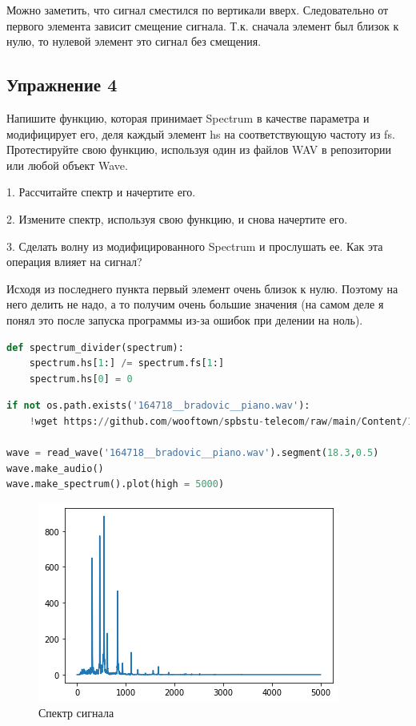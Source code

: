 Можно заметить, что сигнал сместился по вертикали вверх. Следовательно от первого элемента зависит смещение сигнала. Т.к. сначала элемент был близок к нулю, то нулевой элемент это сигнал без смещения.

\subsection{Упражнение 4}

Напишите функцию, которая принимает Spectrum в качестве параметра и модифицирует его, деля каждый элемент hs на соответствующую частоту из fs. Протестируйте свою функцию, используя один из файлов WAV в репозитории или любой объект Wave.

1. Рассчитайте спектр и начертите его.

2. Измените спектр, используя свою функцию, и снова начертите его.

3. Сделать волну из модифицированного Spectrum и прослушать ее. Как эта операция влияет на сигнал?


Исходя из последнего пункта первый элемент очень близок к нулю. Поэтому на него делить не надо, а то получим очень большие значения (на самом деле я понял это после запуска программы из-за ошибок при делении на ноль).

\begin{lstlisting}[language=Python]
def spectrum_divider(spectrum):
    spectrum.hs[1:] /= spectrum.fs[1:]
    spectrum.hs[0] = 0
\end{lstlisting}

\begin{lstlisting}[language=Python]
if not os.path.exists('164718__bradovic__piano.wav'):
    !wget https://github.com/wooftown/spbstu-telecom/raw/main/Content/164718__bradovic__piano.wav
    
wave = read_wave('164718__bradovic__piano.wav').segment(18.3,0.5)
wave.make_audio()
wave.make_spectrum().plot(high = 5000)
\end{lstlisting}

\begin{figure}[H]
	\begin{center}
		\includegraphics[scale=1]{fig/lab02/lab02_35_0.png}
		\caption{Спектр сигнала}
	\end{center}
\end{figure}

